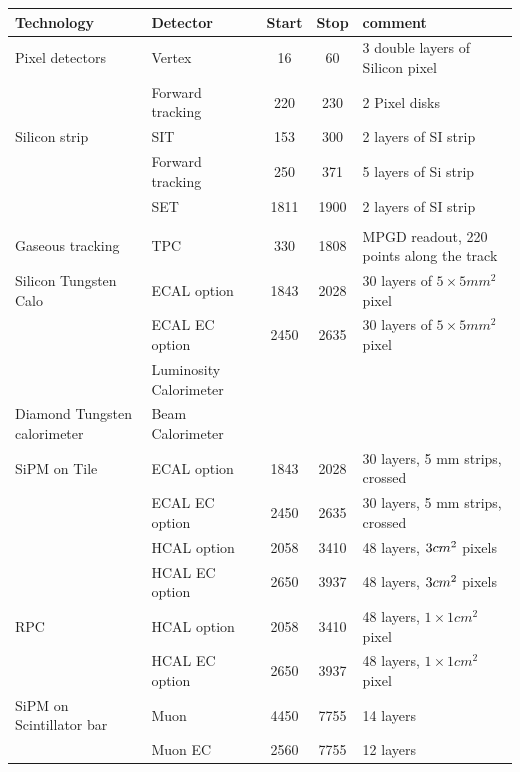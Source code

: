 \documentclass[%
 amsmath,amssymb,
 aps,
]{revtex4-1}
\renewcommand{\toprule}{\hline}
\newcommand{\midrule}{\hline}
\begin{document}
\begin{table}[]
    \centering
    \begin{tabular}{|l|l|c|c|p{4cm}|}
    \toprule
        Technology & Detector & Start   & Stop & comment \\
        \midrule
Pixel detectors & Vertex & 16   & 60   & 3 double layers of Silicon pixel \\
& Forward tracking  & 220 & 230 & 2 Pixel disks \\
\midrule
Silicon strip   & SIT    & 153  & 300  & 2 layers of SI strip            \\
& Forward tracking  & 250 & 371 & 5 layers of Si strip\\
                & SET    & 1811 & 1900 & 2 layers of SI strip           \\
                & & & & \\
Gaseous tracking & TPC & 330 & 1808 & MPGD readout, 220 points along the track\\
\midrule
Silicon Tungsten Calo & ECAL option& 1843 & 2028 & 30 layers of $5\times5 mm^2$ pixel \\
& ECAL EC option & 2450 & 2635 & 30 layers of $5\times5 mm^2$ pixel \\
& Luminosity Calorimeter & & & \\
\midrule
Diamond Tungsten calorimeter & Beam Calorimeter & &&\\
\midrule
SiPM on Tile & ECAL option   & 1843 & 2028 & 30 layers, 5 mm strips, crossed\\
& ECAL EC option& 2450 & 2635 & 30 layers, 5 mm strips, crossed\\
             & HCAL option   & 2058 & 3410 & 48 layers, $3\time3 cm^2$ pixels\\
             & HCAL EC option& 2650 & 3937 & 48 layers, $3\time3 cm^2$ pixels\\
\midrule
RPC          & HCAL option   & 2058 & 3410 & 48 layers, $1 \times 1 cm^2$ pixel \\
& HCAL EC option & 2650 & 3937 & 48 layers, $1 \times 1 cm^2$ pixel\\
\midrule
SiPM on Scintillator bar & Muon & 4450 & 7755 & 14 layers \\
& Muon EC & 2560 & 7755 & 12 layers \\


\end{tabular}
\end{table}
\end{document}
